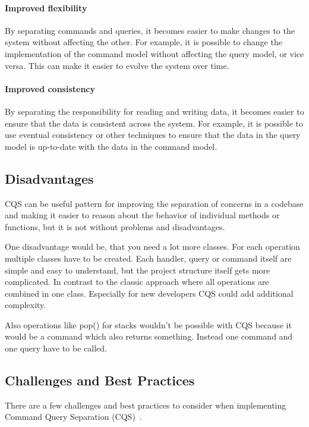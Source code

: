 \documentclass[11pt,conference]{IEEEtran}
\begin{document}
\paragraph{Improved flexibility}
By separating commands and queries, it becomes easier to make changes to the system without affecting the other. For example, it is possible to change the implementation of the command model without affecting the query model, or vice versa. This can make it easier to evolve the system over time.

\paragraph{Improved consistency}
 By separating the responsibility for reading and writing data, it becomes easier to ensure that the data is consistent across the system. For example, it is possible to use eventual consistency or other techniques to ensure that the data in the query model is up-to-date with the data in the command model.

\subsection{Disadvantages}

CQS can be useful pattern for improving the separation of concerns in a codebase and making it easier to reason about the behavior of individual methods or functions, but it is not without problems and disadvantages.

One disadvantage would be, that you need a lot more classes.
For each operation multiple classes have to be created.
Each handler, query or command itself are simple and easy to understand, but the project structure itself gets more complicated.
In contrast to the classic approach where all operations are combined in one class.
Especially for new developers CQS could add additional complexity.

Also operations like pop() for stacks wouldn't be possible with CQS because it would be a command which also returns something.
Instead one command and one query have to be called.

\subsection{Challenges and Best Practices}

There are a few challenges and best practices to consider when implementing Command Query Separation (CQS)~\cite{martinfowler-cqs}.
\end{document}
